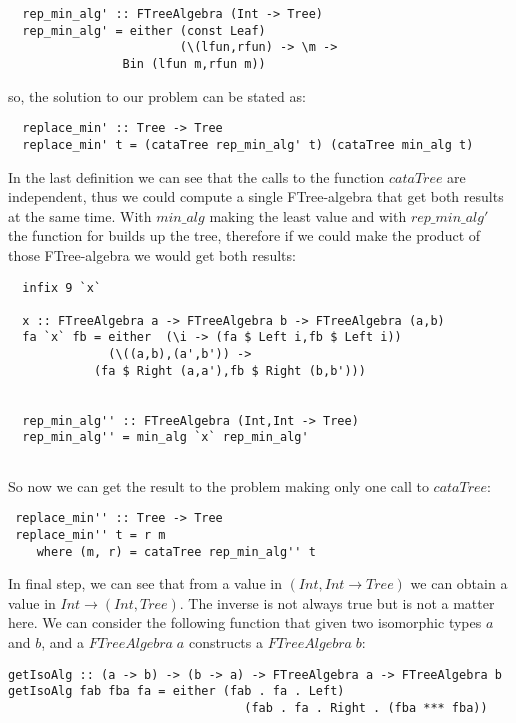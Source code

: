\documentclass[a4paper,10pt]{article}
\begin{document}
\begin{lstlisting}
  rep_min_alg' :: FTreeAlgebra (Int -> Tree)
  rep_min_alg' = either (const Leaf) 
                        (\(lfun,rfun) -> \m -> 
			    Bin (lfun m,rfun m))
\end{lstlisting}

\noindent so, the solution to our problem can be stated as:

\begin{lstlisting}
  replace_min' :: Tree -> Tree
  replace_min' t = (cataTree rep_min_alg' t) (cataTree min_alg t) 
\end{lstlisting}

In the last definition we can see that the calls to the function $cataTree$ are independent, thus
we could compute a single FTree-algebra that get both results at the same time. With $min\_alg$
making the least value and with $rep\_min\_alg'$ the function for builds up the tree, therefore if
we could make the product of those FTree-algebra we would get both results:

\begin{lstlisting}
  infix 9 `x`

  x :: FTreeAlgebra a -> FTreeAlgebra b -> FTreeAlgebra (a,b)
  fa `x` fb = either  (\i -> (fa $ Left i,fb $ Left i))
		      (\((a,b),(a',b')) -> 
			(fa $ Right (a,a'),fb $ Right (b,b')))
			  

  rep_min_alg'' :: FTreeAlgebra (Int,Int -> Tree)
  rep_min_alg'' = min_alg `x` rep_min_alg'
  
\end{lstlisting}

So now we can get the result to the problem making only one call to $cataTree$:

\begin{lstlisting}
 replace_min'' :: Tree -> Tree
 replace_min'' t = r m
    where (m, r) = cataTree rep_min_alg'' t
\end{lstlisting}

In final step, we can see that from a value in $(Int,Int \rightarrow Tree)$ we can
obtain a value in $Int \rightarrow (Int,Tree)$. The inverse is not always true but 
is not a matter here.
We can consider the following function that given two isomorphic types
$a$ and $b$, and a $FTreeAlgebra\;a$ constructs a $FTreeAlgebra\;b$:

\begin{lstlisting}
getIsoAlg :: (a -> b) -> (b -> a) -> FTreeAlgebra a -> FTreeAlgebra b
getIsoAlg fab fba fa = either (fab . fa . Left)
                                 (fab . fa . Right . (fba *** fba))
\end{lstlisting}
\end{document}
